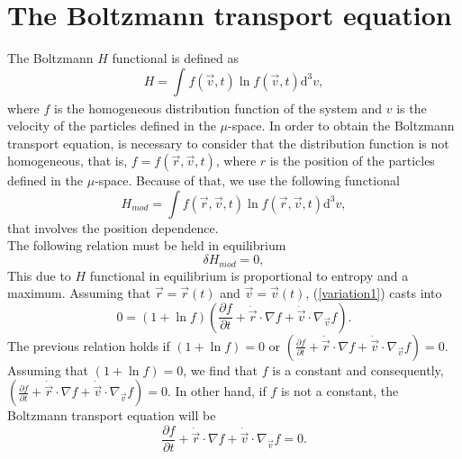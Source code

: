 \documentclass{article}
\begin{document}
\section{The Boltzmann transport equation}
The Boltzmann $H$ functional is defined as
\begin{equation}
    H=\int_{}^{}f(\vec{v},t)\ln f(\vec{v},t)\mathrm{d}^{3}v,
\end{equation}
where $f$ is the homogeneous distribution function of the system and $v$ is the velocity of the particles defined in the $\mu$-space. In order to obtain the Boltzmann transport equation, is necessary to consider that the distribution function is not homogeneous, that is, $f=f(\vec{r},\vec{v},t)$, where $r$ is the position of the particles defined in the $\mu$-space. Because of that, we use the following functional
\begin{equation}
    H_{mod}=\int f(\vec{r},\vec{v},t) \ln f(\vec{r},\vec{v},t) \mathrm{d}^{3}v,
\end{equation}
that involves the position dependence.
\\
The following relation must be held in equilibrium 
\begin{equation}
    \delta H_{mod}=0,\label{variation1}
\end{equation}
This due to $H$ functional in equilibrium is proportional to entropy and a maximum. 
Assuming that $\vec{r}=\vec{r}(t)$ and $\vec{v}=\vec{v}(t)$, (\ref{variation1}) casts into
\begin{equation}
    0=\left( 1+\ln f \right)\left( \frac{\partial f}{\partial t}+\dot{\vec{r}}\cdot \nabla f+\dot{\vec{v}}\cdot \nabla_{\vec{v}} f \right).
\end{equation}
The previous relation holds if $(1+\ln f)=0$ or $(\frac{\partial f}{\partial t}+\dot{\vec{r}}\cdot \nabla f+\dot{\vec{v}}\cdot \nabla_{\vec{v}} f)=0$.\\
Assuming that $(1+\ln f)=0$, we find that $f$ is a constant and consequently, $(\frac{\partial f}{\partial t}+\dot{\vec{r}}\cdot \nabla f+\dot{\vec{v}}\cdot \nabla_{\vec{v}} f)=0$. In other hand, if $f$ is not a constant, the Boltzmann transport equation will be
\begin{equation}
    \frac{\partial f}{\partial t}+\dot{\vec{r}}\cdot \nabla f+\dot{\vec{v}}\cdot \nabla_{\vec{v}} f=0.\label{transport}
\end{equation}
\end{document}
